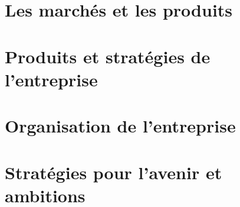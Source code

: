 \section{Les marchés et les produits}

\section{Produits et stratégies de l'entreprise}

\section{Organisation de l'entreprise}

\section{Stratégies pour l'avenir et ambitions}
